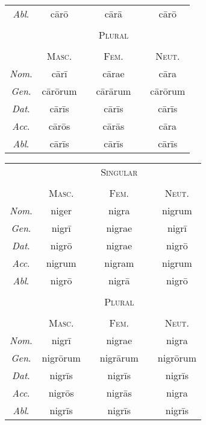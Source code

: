 \documentclass[12pt]{article}
\begin{document}
\begin{enumerate}[1.]
\begin{center}
\begin{tabular}{ c c c c c c }
		\textit{Abl}. & cārō & & cārā & & cārō \\
		& & & & & \\
		& & & \textsc{Plural} & & \\
		& & & & & \\
		& \textsc{Masc}. & & \textsc{Fem}. & & \textsc{Neut}. \\
		\textit{Nom}. & cārī & & cārae & & cāra \\
		\textit{Gen}. & cārōrum & & cārārum & & cārōrum \\
		\textit{Dat}. & cārīs & & cārīs & & cārīs \\
		\textit{Acc}. & cārōs & & cārās & & cāra \\
		\textit{Abl}. & cārīs & & cārīs & & cārīs \\
		\end{tabular}
	\end{center}
	\begin{center}
		\begin{tabular}{ c c c c c c }
		& & & \textsc{Singular} & & \\
		& & & & & \\
		& \textsc{Masc}. & & \textsc{Fem}. & & \textsc{Neut}. \\
		\textit{Nom}. & niger & & nigra & & nigrum \\
		\textit{Gen}. & nigrī & & nigrae & & nigrī \\
		\textit{Dat}. & nigrō & & nigrae & & nigrō \\
		\textit{Acc}. & nigrum & & nigram & & nigrum \\
		\textit{Abl}. & nigrō & & nigrā & & nigrō \\
		& & & & & \\
		& & & \textsc{Plural} & & \\
		& & & & & \\
		& \textsc{Masc}. & & \textsc{Fem}. & & \textsc{Neut}. \\
		\textit{Nom}. & nigrī & & nigrae & & nigra \\
		\textit{Gen}. & nigrōrum & & nigrārum & & nigrōrum \\
		\textit{Dat}. & nigrīs & & nigrīs & & nigrīs \\
		\textit{Acc}. & nigrōs & & nigrās & & nigra \\
		\textit{Abl}. & nigrīs & & nigrīs & & nigrīs \\
		\end{tabular}
	\end{center}
	\begin{center}

\end{center}
\end{enumerate}
\end{document}
